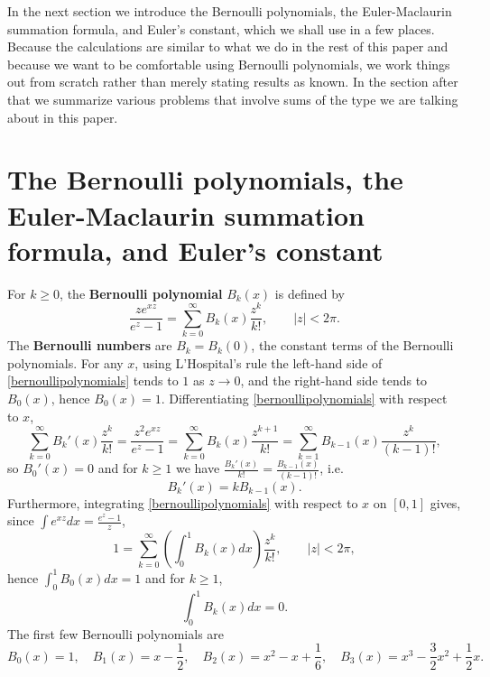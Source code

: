 \documentclass{amsart}
\begin{document}
In the next section we introduce the Bernoulli polynomials, the Euler-Maclaurin summation formula, and Euler's constant, which we shall use in a few places.
Because the calculations are similar to what we do in the rest of this paper and because we want to be comfortable using Bernoulli polynomials, 
we work things out from scratch rather than merely stating results as known.
In the section after  that we summarize various problems that involve sums of the type we are talking about in this paper.





\section{The Bernoulli polynomials, the Euler-Maclaurin summation formula, and Euler's constant}
For $k \geq 0$, the \textbf{Bernoulli polynomial} $B_k(x)$ is defined by
\begin{equation}
\frac{ze^{xz}}{e^z-1} = \sum_{k=0}^\infty B_k(x) \frac{z^k}{k!},\qquad |z|<2\pi.
\label{bernoullipolynomials}
\end{equation}
The \textbf{Bernoulli numbers} are $B_k = B_k(0)$, the constant terms of the Bernoulli polynomials.
For any $x$, using L'Hospital's rule the left-hand side of \eqref{bernoullipolynomials} tends to $1$ as $z \to 0$, and the right-hand side
tends to $B_0(x)$, hence $B_0(x)=1$. 
Differentiating \eqref{bernoullipolynomials} with respect to $x$,
\[
\sum_{k=0}^\infty B_k'(x) \frac{z^k}{k!} = \frac{z^2 e^{xz}}{e^z-1} = \sum_{k=0}^\infty B_k(x) \frac{z^{k+1}}{k!}
=\sum_{k=1}^\infty B_{k-1}(x) \frac{z^k}{(k-1)!},
\]
so $B_0'(x) = 0$ and for $k \geq 1$ we have $\frac{B_k'(x)}{k!} = \frac{B_{k-1}(x)}{(k-1)!}$, i.e.
\[
B_k'(x)=k B_{k-1}(x).
\]
Furthermore, integrating \eqref{bernoullipolynomials} with respect
to $x$ on $[0,1]$ gives, since $\int e^{xz} dx = \frac{e^z-1}{z}$,
\[
1 = \sum_{k=0}^\infty \left( \int_0^1 B_k(x) dx \right) \frac{z^k}{k!},\qquad |z|<2\pi,
\]
hence $\int_0^1 B_0(x) dx =1$ and for $k \geq 1$,
\[
\int_0^1 B_k(x) dx = 0.
\] 
The first few Bernoulli polynomials are
\[
B_0(x)=1,\quad B_1(x) = x-\frac{1}{2},\quad B_2(x) = x^2-x+\frac{1}{6},
\quad B_3(x)=x^3-\frac{3}{2}x^2+\frac{1}{2}x.
\]
\end{document}
